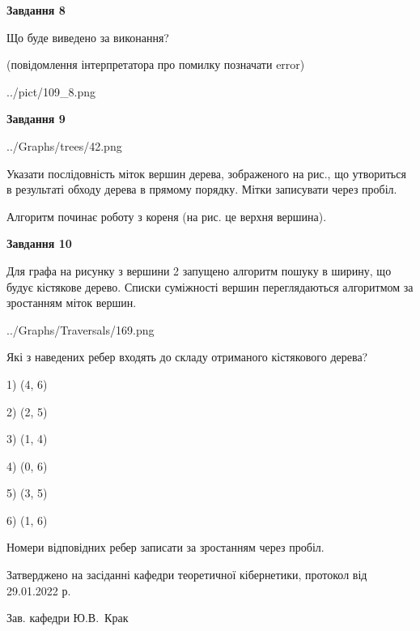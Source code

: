 \documentclass[12pt, ukrainian]{article}
\begin{document}
{\begin {large}
{\begin {center}\textbf{Завдання 8}\end {center}}\par
Що буде виведено за виконання?\par
 (повідомлення інтерпретатора про помилку позначати error)\par
\begin{center}
	{../pict/109_8.png}
\end{center}
\newpage

{\begin {center}\textbf{Завдання 9}\end {center}}\par

\begin{center}
	{../Graphs/trees/42.png}
\end{center}
Указати послідовність міток вершин дерева, зображеного на рис., що утвориться в результаті обходу дерева в прямому порядку. Мітки записувати через пробіл.\par Алгоритм починає роботу з кореня (на рис. це верхня вершина).\par
\newpage

{\begin {center}\textbf{Завдання 10}\end {center}}\par
Для графа на рисунку з вершини 2 запущено алгоритм пошуку в ширину, що будує кістякове дерево. Списки суміжності вершин переглядаються алгоритмом за зростанням міток вершин.\par
\begin{center}
	{../Graphs/Traversals/169.png}
\end{center}
\par Які з наведених ребер входять до складу отриманого кістякового дерева?\par
1) (4, 6)\par
2) (2, 5)\par
3) (1, 4)\par
4) (0, 6)\par
5) (3, 5)\par
6) (1, 6)\par
{\vskip 15pt} Номери відповідних ребер записати за зростанням через пробіл.\par
\newpage


\end {large}
}
{\smallskip \begin {small} Затверджено на засіданні кафедри теоретичної кібернетики, протокол  від   29.01.2022 р.\par\smallskip\smallskip
{\parbox {6.5 cm}{Зав. кафедри \dotfill Ю.В.~Крак}} \end{small}}
\end{document}
